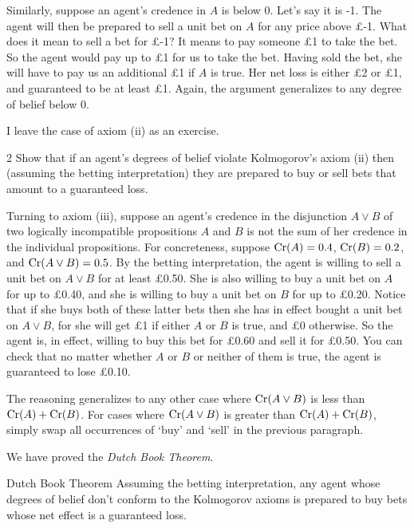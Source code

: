 Similarly, suppose an agent's credence in $A$ is below 0. Let's say it is -1.
The agent will then be prepared to sell a unit bet on $A$ for any price above
£-1. What does it mean to sell a bet for £-1? It means to pay someone £1 to take
the bet. So the agent would pay up to £1 for us to take the bet. Having sold the
bet, she will have to pay us an additional £1 if $A$ is true. Her net loss is
either £2 or £1, and guaranteed to be at least £1. Again, the argument generalizes
to any degree of belief below 0.

I leave the case of axiom (ii) as an exercise.

\begin{exercise}{2}
  Show that if an agent's degrees of belief violate Kolmogorov's axiom (ii) then
  (assuming the betting interpretation) they are prepared to buy or sell bets
  that amount to a guaranteed loss.
\end{exercise}

Turning to axiom (iii), suppose an agent's credence in the disjunction
$A \lor B$ of two logically incompatible propositions $A$ and $B$ is not the sum
of her credence in the individual propositions. For concreteness, suppose
$\text{Cr}(A) = 0.4$, $\text{Cr}(B) = 0.2$, and $\text{Cr}(A \lor B) = 0.5$. By the betting
interpretation, the agent is willing to sell a unit bet on $A \lor B$ for at
least £0.50. She is also willing to buy a unit bet on $A$ for up to £0.40, and
she is willing to buy a unit bet on $B$ for up to £0.20. Notice that if she buys
both of these latter bets then she has in effect bought a unit bet on
$A \lor B$, for she will get £1 if either $A$ or $B$ is true, and £0 otherwise.
So the agent is, in effect, willing to buy this bet for £0.60 and sell it for
£0.50. You can check that no matter whether $A$ or $B$ or neither of them is
true, the agent is guaranteed to lose £0.10.

The reasoning generalizes to any other case where $\text{Cr}(A \lor B)$ is less than
$\text{Cr}(A) + \text{Cr}(B)$. For cases where $\text{Cr}(A \lor B)$ is greater than
$\text{Cr}(A) + \text{Cr}(B)$, simply swap all occurrences of `buy' and `sell' in the
previous paragraph.

We have proved the \emph{Dutch Book Theorem}.

\begin{genericthm}{Dutch Book Theorem}
  Assuming the betting interpretation, any agent whose degrees of belief don't
  conform to the Kolmogorov axioms is prepared to buy bets whose net effect is a
  guaranteed loss.
\end{genericthm}

